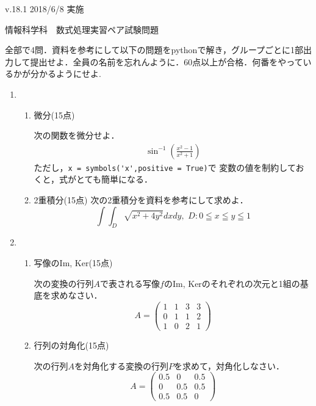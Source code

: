 \documentclass[12pt,a4j]{jarticle}
\begin{document}
\small{v.18.1}
\hfill\small{2018/6/8 実施}
\begin{center}
{\gt\large{情報科学科　数式処理実習ペア試験問題}}
\end{center}
\vspace{5mm}

全部で4問．資料を参考にして以下の問題をpythonで解き，グループごとに1部出力して提出せよ．全員の名前を忘れんように．60点以上が合格．何番をやっているかが分かるようにせよ.

\begin{enumerate}

\item 
\begin{enumerate}
\item 微分(15点) 

次の関数を微分せよ．
\begin{eqnarray*}
\sin^{-1}{\left (\frac{x^{2} - 1}{x^{2} + 1} \right )}
\end{eqnarray*}
ただし，\verb|x = symbols('x',positive = True)|で
変数の値を制約しておくと，式がとても簡単になる．

\item 2重積分(15点)
次の2重積分を資料を参考にして求めよ．
\begin{equation*}
\int \int_D \sqrt{x^2+4y^2}dxdy, \, \, 
D:0\leqq x \leqq y \leqq 1
\end{equation*}
\end{enumerate}

\item
\begin{enumerate}
\item 写像のIm, Ker(15点)

次の変換の行列$A$で表される写像$f$のIm, Kerのそれぞれの次元と1組の基底を求めなさい．
\begin{equation*}
A = \left(\begin{matrix}1 & 1 & 3 & 3\\0 & 1 & 1 & 2\\1 & 0 & 2 & 1\end{matrix}\right)
\end{equation*}
\item  行列の対角化(15点)

次の行列$A$を対角化する変換の行列$P$を求めて，対角化しなさい．
\begin{equation*}
A=\left(\begin{matrix}0.5 & 0 & 0.5\\0 & 0.5 & 0.5\\0.5 & 0.5 & 0\end{matrix}\right)
\end{equation*}


\end{enumerate}
\end{enumerate}
\end{document}
